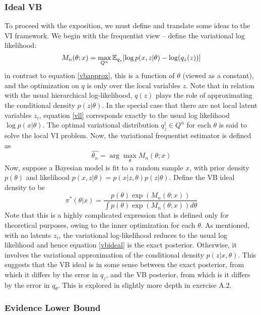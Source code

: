\subsubsection{Ideal VB}
To proceed with the exposition, we must define and translate some ideas to the VI framework. We begin with the frequentist view -- define the variational log likelihood:
\begin{equation}
\label{vll}
M_n(\theta; x) = \max_{Q^n} \mathbb{E}_{q_z}[\log p(x,z|\theta) - \log(q_z(z))]
\end{equation}
%
in contrast to equation \ref{vbapprox}, this is a function of $\theta$ (viewed as a constant), and the optimization on $q$ is only over the local variables $z$. Note that in relation with the usual hierarchical log-likelihood, $q(z)$ plays the role of approximating the conditional density $p(z|\theta)$. In the special case that there are not local latent variables $z_i$, equation \ref{vll} corresponds exactly to the usual log likelihood $\log p(x|\theta)$. The optimal variational distribution $q_z^{\dagger} \in Q^n$ for each $\theta$ is said to solve the local VI problem. Now, the variational frequentist estimator is defined as
\begin{equation}
\hat{\theta_n} = \arg \max_{\theta} M_n(\theta; x)
\end{equation}
Now, suppose a Bayesian model is fit to a random sample $x$, with prior density $p(\theta)$ and likelihood $p(x, z | \theta) = p(x|z, \theta)p(z|\theta)$. Define the VB ideal density to be
\begin{equation}
\label{vbideal}
\pi^*(\theta|x) = \frac{p(\theta)\exp(M_n(\theta; x))}{\int p(\theta)\exp(M_n(\theta;x))d\theta}
\end{equation}
%
Note that this is a highly complicated expression that is defined only for theoretical purposes, owing to the inner optimization for each $\theta$. As mentioned, with no latents $z_i$, the variational log-likelihood reduces to the usual log likelihood and hence equation \ref{vbideal} is the exact posterior. Otherwise, it involves the variational approximation of the conditional density $p(z|x, \theta)$. This suggests that the VB ideal is in some sense between the exact posterior, from which it differs by the error in $q_z$, and the VB posterior, from which is it differs by the error in $q_\theta$. This is explored in slightly more depth in exercise A.2. 

\subsubsection{Evidence Lower Bound}

